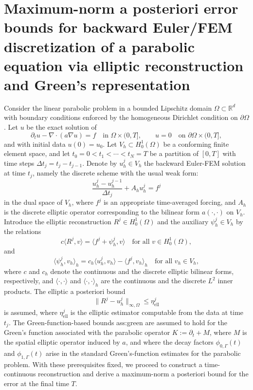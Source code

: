 \documentclass[11pt]{article}
\begin{document}
\section*{Maximum-norm a posteriori error bounds for backward Euler/FEM discretization of a parabolic equation via elliptic reconstruction and Green's representation}

Consider the linear parabolic problem in a bounded Lipschitz domain $\Omega \subset \mathbb{R}^d$ with boundary conditions enforced by the homogeneous Dirichlet condition on $\partial \Omega$. Let $u$ be the exact solution of
\[
\partial_t u - \nabla \cdot (a \nabla u) = f \quad \text{in } \Omega \times (0,T], \qquad
u = 0 \quad \text{on } \partial \Omega \times (0,T],
\]
and with initial data $u(0) = u_0$. Let $V_h \subset H^1_0(\Omega)$ be a conforming finite element space, and let $t_0 = 0 < t_1 < \cdots < t_N = T$ be a partition of $[0,T]$ with time steps $\Delta t_j = t_j - t_{j-1}$. Denote by $u_h^j \in V_h$ the backward Euler-FEM solution at time $t_j$, namely the discrete scheme with the usual weak form:
\[
\frac{u_h^j - u_h^{j-1}}{\Delta t_j} + A_h u_h^j = f^j
\]
in the dual space of $V_h$, where $f^j$ is an appropriate time-averaged forcing, and $A_h$ is the discrete elliptic operator corresponding to the bilinear form $a(\cdot,\cdot)$ on $V_h$. Introduce the elliptic reconstruction $R^j \in H^1_0(\Omega)$ and the auxiliary $\psi_h^j \in V_h$ by the relations
\[
c\langle R^j, v \rangle = \langle f^j + \psi_h^j, v \rangle \quad \text{for all } v \in H^1_0(\Omega),
\]
and
\[
\langle \psi_h^j, v_h \rangle_h = c_h\langle u_h^j, v_h \rangle - \langle f^j, v_h \rangle_h \quad \text{for all } v_h \in V_h,
\]
where $c$ and $c_h$ denote the continuous and the discrete elliptic bilinear forms, respectively, and $\langle\cdot,\cdot\rangle$ and $\langle\cdot,\cdot\rangle_h$ are the continuous and the discrete $L^2$ inner products. The elliptic a posteriori bound
\[
\|R^j - u_h^j\|_{\infty,\Omega} \le \eta^j_{\mathrm{ell}}
\]
is assumed, where $\eta^j_{\mathrm{ell}}$ is the elliptic estimator computable from the data at time $t_j$. The Green-function-based bounds ass:green are assumed to hold for the Green's function associated with the parabolic operator $K := \partial_t + M$, where $M$ is the spatial elliptic operator induced by $a$, and where the decay factors $\phi_{0,\Gamma}(t)$ and $\phi_{1,\Gamma}(t)$ arise in the standard Green's-function estimates for the parabolic problem. With these prerequisites fixed, we proceed to construct a time-continuous reconstruction and derive a maximum-norm a posteriori bound for the error at the final time $T$.
\end{document}
